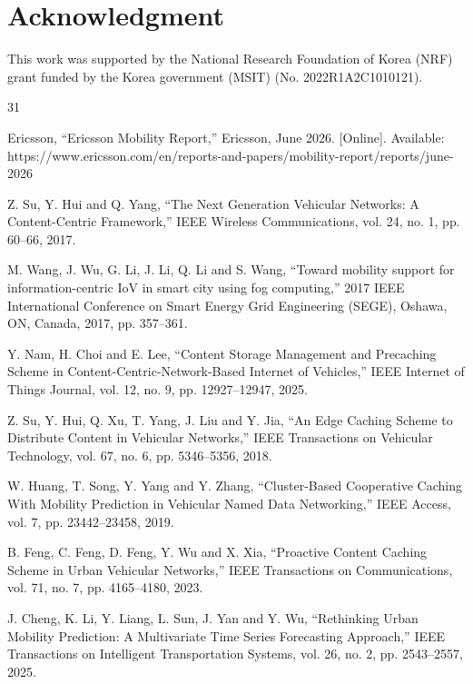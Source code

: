 \documentclass[journal]{IEEEtran}
\begin{document}
\section*{Acknowledgment}
This work was supported by the National Research Foundation of Korea (NRF) grant funded by the Korea government (MSIT) (No. 2022R1A2C1010121).




\begin{thebibliography}{31}

Ericsson, ``Ericsson Mobility Report,'' Ericsson, June 2026. [Online]. Available: https://www.ericsson.com/en/reports-and-papers/mobility-report/reports/june-2026

Z. Su, Y. Hui and Q. Yang, ``The Next Generation Vehicular Networks: A Content-Centric Framework,'' IEEE Wireless Communications, vol. 24, no. 1, pp. 60--66, 2017.

M. Wang, J. Wu, G. Li, J. Li, Q. Li and S. Wang, ``Toward mobility support for information-centric IoV in smart city using fog computing,'' 2017 IEEE International Conference on Smart Energy Grid Engineering (SEGE), Oshawa, ON, Canada, 2017, pp. 357--361.

Y. Nam, H. Choi and E. Lee, ``Content Storage Management and Precaching Scheme in Content-Centric-Network-Based Internet of Vehicles,'' IEEE Internet of Things Journal, vol. 12, no. 9, pp. 12927--12947, 2025.

Z. Su, Y. Hui, Q. Xu, T. Yang, J. Liu and Y. Jia, ``An Edge Caching Scheme to Distribute Content in Vehicular Networks,'' IEEE Transactions on Vehicular Technology, vol. 67, no. 6, pp. 5346--5356, 2018.

W. Huang, T. Song, Y. Yang and Y. Zhang, ``Cluster-Based Cooperative Caching With Mobility Prediction in Vehicular Named Data Networking,'' IEEE Access, vol. 7, pp. 23442--23458, 2019.

B. Feng, C. Feng, D. Feng, Y. Wu and X. Xia, ``Proactive Content Caching Scheme in Urban Vehicular Networks,'' IEEE Transactions on Communications, vol. 71, no. 7, pp. 4165--4180, 2023.

J. Cheng, K. Li, Y. Liang, L. Sun, J. Yan and Y. Wu, ``Rethinking Urban Mobility Prediction: A Multivariate Time Series Forecasting Approach,'' IEEE Transactions on Intelligent Transportation Systems, vol. 26, no. 2, pp. 2543--2557, 2025.


\end{thebibliography}
\end{document}
